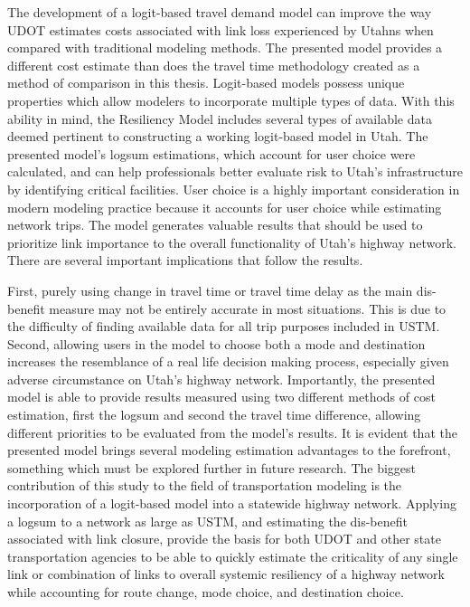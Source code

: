 The development of a logit-based travel demand model can improve the way UDOT
estimates costs associated with link loss experienced by Utahns when compared
with traditional modeling methods. The presented model provides a different cost
estimate than does the travel time methodology created as a method of comparison
in this thesis. Logit-based models possess unique properties which allow modelers
to incorporate multiple types of data. With this ability in mind, the Resiliency
Model includes several types of available data deemed pertinent to
constructing a working logit-based model in Utah. The presented model's
logsum estimations, which account for user choice were calculated, and can help
professionals better evaluate risk to Utah's infrastructure by identifying
critical facilities. User choice is a highly important consideration in modern modeling practice because it accounts for user choice while estimating
network trips. The model generates valuable results that should
be used to prioritize link importance to the overall functionality of Utah's
highway network. There are several important implications that follow the
results.

First, purely
using change in travel time or travel time delay as the main dis-benefit measure may not
be entirely accurate in most situations. This is due to the difficulty of finding
available data for all trip purposes included in USTM. Second, allowing users in the model
to choose both a mode and destination increases the resemblance of a real life
decision making process, especially given adverse circumstance on Utah's
highway network. Importantly, the presented model is able to provide results measured
using two different methods of cost estimation, first the logsum and second the travel time difference,
allowing different priorities to be evaluated from the model's results.
It is evident that the presented model brings several
modeling estimation advantages to the forefront, something which must be
explored further in future research. The biggest contribution of this study to
the field of transportation modeling is the incorporation of a logit-based model
into a statewide highway network. Applying a logsum to a network as large as USTM, and
estimating the dis-benefit associated with link closure, provide the basis for both
UDOT and other state transportation agencies to be able to quickly estimate
the criticality of any single link or combination of links to overall systemic
resiliency of a highway network while accounting for route change, mode choice, and destination choice.
